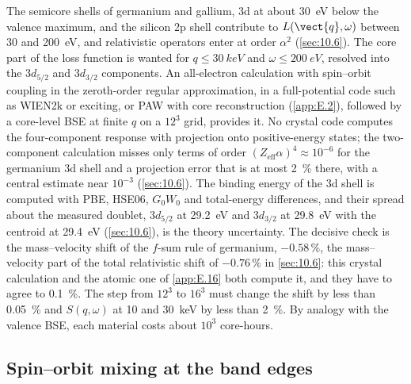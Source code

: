 The semicore shells of germanium and gallium, 3d at about \SI{30}{eV} below the valence maximum, and the silicon 2p shell contribute to $L(\vect{q},\omega)$ between 30 and \SI{200}{eV}, and relativistic operators enter at order $\alpha^2$ (\cref{sec:10.6}). The core part of the loss function is wanted for $q \le \SI{30}{keV}$ and $\omega \le \SI{200}{eV}$, resolved into the $3d_{5/2}$ and $3d_{3/2}$ components. An all-electron calculation with spin--orbit coupling in the zeroth-order regular approximation, in a full-potential code such as WIEN2k or exciting, or PAW with core reconstruction (\cref{app:E.2}), followed by a core-level BSE at finite $q$ on a $12^3$ grid, provides it. No crystal code computes the four-component response with projection onto positive-energy states; the two-component calculation misses only terms of order $(Z_{\mathrm{eff}}\alpha)^4 \approx 10^{-6}$ for the germanium 3d shell and a projection error that is at most \SI{2}{\percent} there, with a central estimate near $10^{-3}$ (\cref{sec:10.6}). The binding energy of the 3d shell is computed with PBE, HSE06, $G_0W_0$ and total-energy differences, and their spread about the measured doublet, $3d_{5/2}$ at \SI{29.2}{eV} and $3d_{3/2}$ at \SI{29.8}{eV} with the centroid at \SI{29.4}{eV} (\cref{sec:10.6}), is the theory uncertainty. The decisive check is the mass--velocity shift of the $f$-sum rule of germanium, $-0.58\,\%$, the mass--velocity part of the total relativistic shift of $-0.76\,\%$ in \cref{sec:10.6}: this crystal calculation and the atomic one of \cref{app:E.16} both compute it, and they have to agree to \SI{0.1}{\percent}. The step from $12^3$ to $16^3$ must change the shift by less than \SI{0.05}{\percent} and $S(q,\omega)$ at 10 and \SI{30}{keV} by less than \SI{2}{\percent}. By analogy with the valence BSE, each material costs about $10^3$ core-hours.

\subsection{Spin--orbit mixing at the band edges}

